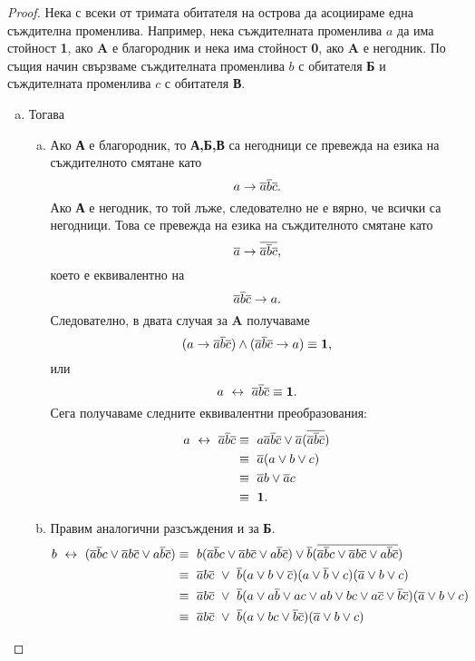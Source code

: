 \begin{proof}
  Нека с всеки от тримата обитателя на острова да асоциираме една съждителна променлива.
  Например, нека съждителната променлива $a$ да има стойност {\bf 1}, ако {\bf A} е благородник и нека има стойност {\bf 0}, 
  ако {\bf A} е негодник. По същия начин свързваме съждителната променлива $b$ с обитателя {\bf Б} и 
  съждителната променлива $c$ с обитателя {\bf В}.
  \begin{enumerate}[a)]
  \item
    Тогава
    \begin{enumerate}[a)]
    \item
      Ако {\bf А} е благородник, то {\bf А,Б,В} са негодници се превежда на езика на съждителното смятане като
      \[a \rightarrow \overline{a}\overline{b}\overline{c}.\]
      Ако {\bf А} е негодник, то той лъже, следователно не е вярно, че всички са негодници. Това се превежда на езика на съждителното смятане като
      \[\overline{a} \rightarrow \overline{\overline{a}\overline{b}\overline{c}},\] 
      което е еквивалентно на \[\overline{a}\overline{b}\overline{c}\rightarrow a.\]
      Следователно, в двата случая за {\bf A} получаваме
      \[(a \rightarrow \overline{a}\overline{b}\overline{c}) \wedge (\overline{a}\overline{b}\overline{c}\rightarrow a) \equiv \mathbf{1},\]
      или
      \[a \ \leftrightarrow\  \overline{a}\overline{b}\overline{c} \equiv \mathbf{1}.\]
      Сега получаваме следните еквивалентни преобразования:
      \begin{align*}
        a \ \leftrightarrow\  \overline{a}\overline{b}\overline{c} & \equiv\ a\overline{a}\overline{b}\overline{c} \vee \overline{a}(\overline{\overline{a}\overline{b}\overline{c}})\\
        & \equiv\ \overline{a}(a \vee b \vee c)\\
        & \equiv\ \overline{a}b \vee \overline{a}c\\
        & \equiv\ \mathbf{1}.
      \end{align*}
    \item
      Правим аналогични разсъждения и за {\bf Б}.
      \begin{align*}
        b \iff (\ov{a}\ov{b}c\vee \ov{a}b\ov{c}\vee a\ov{b}\ov{c}) & \equiv\ b(\ov{a}\ov{b}c\vee \ov{a}b\ov{c}\vee a\ov{b}\ov{c})\vee \ov{b}(\ov{\ov{a}\ov{b}c\vee \ov{a}b\ov{c}\vee a\ov{b}\ov{c}})\\
        & \equiv\ \ov{a}b\ov{c}\ \vee\ \ov{b}(a\vee b \vee \ov{c})(a\vee\ov{b}\vee c)(\ov{a} \vee b \vee c)\\
        & \equiv\ \ov{a}b\ov{c}\ \vee\ \ov{b}(a \vee a\ov{b} \vee ac \vee ab \vee bc \vee a\ov{c} \vee \ov{b}\ov{c})(\ov{a} \vee b \vee c)\\
        & \equiv\ \ov{a}b\ov{c}\ \vee\ \ov{b}(a \vee bc \vee \ov{b}\ov{c})(\ov{a} \vee b \vee c)\\

\end{align*}
\end{enumerate}
\end{enumerate}
\end{proof}
